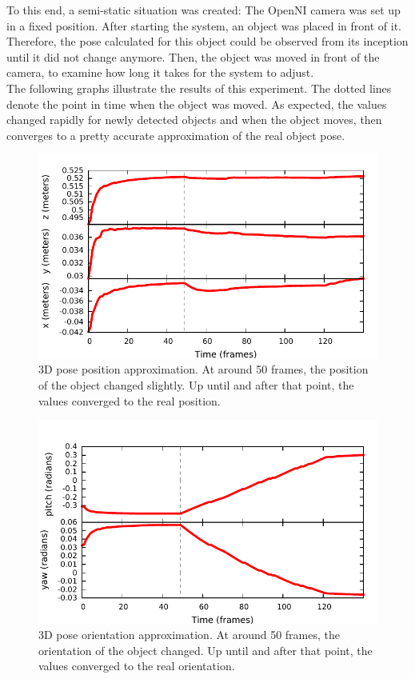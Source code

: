 To this end, a semi-static situation was created: The OpenNI camera was set up in a fixed position. After starting the system, an object was placed in front of it. Therefore, the pose calculated for this object could be observed from its inception until it did not change anymore. Then, the object was moved in front of the camera, to examine how long it takes for the system to adjust. \\

The following graphs illustrate the results of this experiment. The dotted lines denote the point in time when the object was moved. As expected, the values changed rapidly for newly detected objects and when the object moves, then converges to a pretty accurate approximation of the real object pose.

\begin{figure}[H]
  \includegraphics[width=1.0\textwidth]{images/3D-poses-position.pdf}
  \caption[3D poses position convergence]{3D pose position approximation. At around 50 frames, the position of the object changed slightly. Up until and after that point, the values converged to the real position.}
\end{figure}

\begin{figure}[H]
  \includegraphics[width=1.0\textwidth]{images/3D-poses-orientation.pdf}
  \caption[3D poses orientation convergence]{3D pose orientation approximation. At around 50 frames, the orientation of the object changed. Up until and after that point, the values converged to the real orientation.}
\end{figure}

